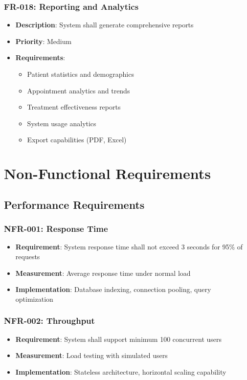 \documentclass[12pt,a4paper]{article}
\begin{document}
\subsubsection{FR-018: Reporting and Analytics}
\begin{itemize}
    \item \textbf{Description}: System shall generate comprehensive reports
    \item \textbf{Priority}: Medium
    \item \textbf{Requirements}:
    \begin{itemize}
        \item Patient statistics and demographics
        \item Appointment analytics and trends
        \item Treatment effectiveness reports
        \item System usage analytics
        \item Export capabilities (PDF, Excel)
    \end{itemize}
\end{itemize}

\section{Non-Functional Requirements}

\subsection{Performance Requirements}

\subsubsection{NFR-001: Response Time}
\begin{itemize}
    \item \textbf{Requirement}: System response time shall not exceed 3 seconds for 95\% of requests
    \item \textbf{Measurement}: Average response time under normal load
    \item \textbf{Implementation}: Database indexing, connection pooling, query optimization
\end{itemize}

\subsubsection{NFR-002: Throughput}
\begin{itemize}
    \item \textbf{Requirement}: System shall support minimum 100 concurrent users
    \item \textbf{Measurement}: Load testing with simulated users
    \item \textbf{Implementation}: Stateless architecture, horizontal scaling capability
\end{itemize}
\end{document}
